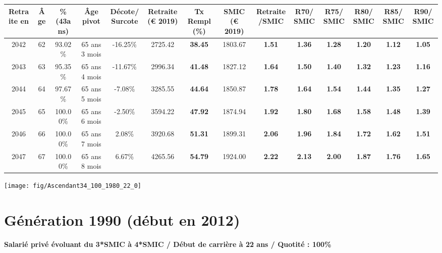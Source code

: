 \begin{adjustbox}{max width=\textwidth} 
\begin{tabular}[htb]{|c|c||c|c|c||c|c||c|c||c|c|c|c|c|} 
\hline 
 Retraite en &  Âge &  \%(43ans) &  Âge pivot &  Décote/Surcote &  Retraite (\euro{} 2019) &  Tx Rempl(\%) &  SMIC (\euro{} 2019) &  Retraite/SMIC &  R70/SMIC &  R75/SMIC &  R80/SMIC &  R85/SMIC &  R90/SMIC \\ 
\hline \hline 
 2042 &  62 &  93.02\% &  65 ans 3 mois &  -16.25\% &  2725.42 &  {\bf 38.45} &  1803.67 &  {\bf 1.51} &  {\bf 1.36} &  {\bf 1.28} &  {\bf 1.20} &  {\bf 1.12} &  {\bf 1.05} \\ 
\hline 
 2043 &  63 &  95.35\% &  65 ans 4 mois &  -11.67\% &  2996.34 &  {\bf 41.48} &  1827.12 &  {\bf 1.64} &  {\bf 1.50} &  {\bf 1.40} &  {\bf 1.32} &  {\bf 1.23} &  {\bf 1.16} \\ 
\hline 
 2044 &  64 &  97.67\% &  65 ans 5 mois &  -7.08\% &  3285.55 &  {\bf 44.64} &  1850.87 &  {\bf 1.78} &  {\bf 1.64} &  {\bf 1.54} &  {\bf 1.44} &  {\bf 1.35} &  {\bf 1.27} \\ 
\hline 
 2045 &  65 &  100.00\% &  65 ans 6 mois &  -2.50\% &  3594.22 &  {\bf 47.92} &  1874.94 &  {\bf 1.92} &  {\bf 1.80} &  {\bf 1.68} &  {\bf 1.58} &  {\bf 1.48} &  {\bf 1.39} \\ 
\hline 
 2046 &  66 &  100.00\% &  65 ans 7 mois &  2.08\% &  3920.68 &  {\bf 51.31} &  1899.31 &  {\bf 2.06} &  {\bf 1.96} &  {\bf 1.84} &  {\bf 1.72} &  {\bf 1.62} &  {\bf 1.51} \\ 
\hline 
 2047 &  67 &  100.00\% &  65 ans 8 mois &  6.67\% &  4265.56 &  {\bf 54.79} &  1924.00 &  {\bf 2.22} &  {\bf 2.13} &  {\bf 2.00} &  {\bf 1.87} &  {\bf 1.76} &  {\bf 1.65} \\ 
\hline 
\hline 
\end{tabular} 
\end{adjustbox} 
 
 \vspace{0.1cm} 

 {\hspace{-2.2cm}\texttt{[image: fig/Ascendant34\_100\_1980\_22\_0]}} 

\newpage 
 
\section{Génération 1990 (début en 2012)\label{Ascendant34_100_1990_22_0}} 
 
{\bf \noindent Salarié privé évoluant du 3*SMIC à 4*SMIC / Début de carrière à 22 ans / Quotité : 100\%}  ~ 

